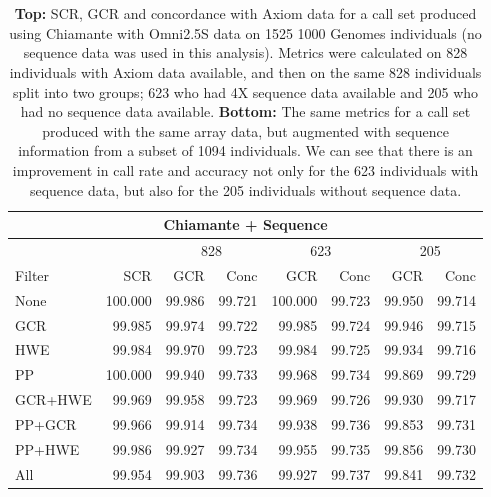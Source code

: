 \begin{table}
\begin{center}
~\\
~\\
\begin{tabular}{|l|r|rr|rr|rr|}
\hline
\multicolumn{8}{|c|}{Chiamante + Sequence}\\
\hline
&&\multicolumn{2}{c}{828}&\multicolumn{2}{|c}{623}&\multicolumn{2}{|c|}{205}\\
\hline
Filter & SCR & GCR & Conc & GCR & Conc & GCR & Conc \\ 
\hline
None & 100.000 & 99.986 & 99.721 & 100.000 & 99.723 & 99.950 & 99.714 \\ 
GCR & 99.985 & 99.974 & 99.722 & 99.985 & 99.724 & 99.946 & 99.715 \\ 
HWE & 99.984 & 99.970 & 99.723 & 99.984 & 99.725 & 99.934 & 99.716 \\ 
PP & 100.000 & 99.940 & 99.733 & 99.968 & 99.734 & 99.869 & 99.729 \\ 
\hline
GCR+HWE & 99.969 & 99.958 & 99.723 & 99.969 & 99.726 & 99.930 & 99.717 \\ 
PP+GCR & 99.966 & 99.914 & 99.734 & 99.938 & 99.736 & 99.853 & 99.731 \\ 
PP+HWE & 99.986 & 99.927 & 99.734 & 99.955 & 99.735 & 99.856 & 99.730 \\ 
\hline
All & 99.954 & 99.903 & 99.736 & 99.927 & 99.737 & 99.841 & 99.732 \\ 
\hline
\end{tabular}
\caption[Breakdown of genotype calling performing for
sequenced/non-sequenced samples]{\textbf{Top:} SCR, GCR and concordance with Axiom data for a call set produced using Chiamante with Omni2.5S data on 1525 1000 Genomes individuals (no sequence data was used in this analysis).  Metrics were calculated on 828 individuals with Axiom data available, and then on the same 828 individuals split into two groups; 623 who had 4X sequence data available and 205 who had no sequence data available. \textbf{Bottom:} The same metrics for a call set produced with the same array data, but augmented with sequence information from a subset of 1094 individuals. We can see that there is an improvement in call rate and accuracy not only for the 623 individuals with sequence data, but also for the 205 individuals without sequence data.\label{chap2:results:splitchi}}
\end{center}
\end{table}


